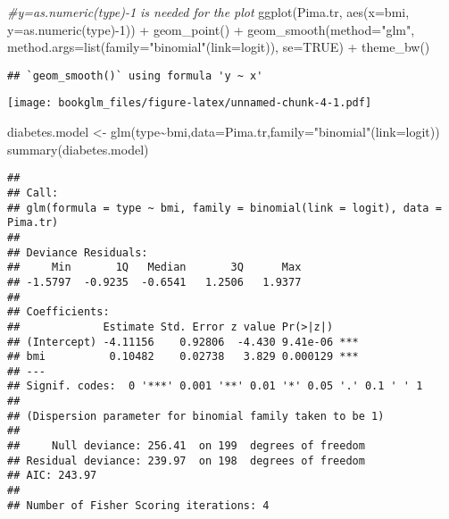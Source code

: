 \documentclass[
]{book}
\newenvironment{Shaded}{\begin{snugshade}}{\end{snugshade}}
\newcommand{\AttributeTok}[1]{\textcolor[rgb]{0.77,0.63,0.00}{#1}}
\newcommand{\CommentTok}[1]{\textcolor[rgb]{0.56,0.35,0.01}{\textit{#1}}}
\newcommand{\ConstantTok}[1]{\textcolor[rgb]{0.00,0.00,0.00}{#1}}
\newcommand{\DecValTok}[1]{\textcolor[rgb]{0.00,0.00,0.81}{#1}}
\newcommand{\FunctionTok}[1]{\textcolor[rgb]{0.00,0.00,0.00}{#1}}
\newcommand{\NormalTok}[1]{#1}
\newcommand{\OtherTok}[1]{\textcolor[rgb]{0.56,0.35,0.01}{#1}}
\newcommand{\SpecialCharTok}[1]{\textcolor[rgb]{0.00,0.00,0.00}{#1}}
\newcommand{\StringTok}[1]{\textcolor[rgb]{0.31,0.60,0.02}{#1}}
\begin{document}
\begin{Shaded}
\begin{Highlighting}[]
\CommentTok{\#y=as.numeric(type){-}1 is needed for the plot}
\FunctionTok{ggplot}\NormalTok{(Pima.tr, }\FunctionTok{aes}\NormalTok{(}\AttributeTok{x=}\NormalTok{bmi, }\AttributeTok{y=}\FunctionTok{as.numeric}\NormalTok{(type)}\SpecialCharTok{{-}}\DecValTok{1}\NormalTok{)) }\SpecialCharTok{+} \FunctionTok{geom\_point}\NormalTok{() }\SpecialCharTok{+}
\FunctionTok{geom\_smooth}\NormalTok{(}\AttributeTok{method=}\StringTok{"glm"}\NormalTok{,}
\AttributeTok{method.args=}\FunctionTok{list}\NormalTok{(}\AttributeTok{family=}\StringTok{"binomial"}\NormalTok{(}\AttributeTok{link=}\NormalTok{logit)), }\AttributeTok{se=}\ConstantTok{TRUE}\NormalTok{) }\SpecialCharTok{+}
\FunctionTok{theme\_bw}\NormalTok{()}
\end{Highlighting}
\end{Shaded}

\begin{verbatim}
## `geom_smooth()` using formula 'y ~ x'
\end{verbatim}

\texttt{[image: bookglm\_files/figure-latex/unnamed-chunk-4-1.pdf]}

\begin{Shaded}
\begin{Highlighting}[]
\NormalTok{diabetes.model }\OtherTok{\textless{}{-}} \FunctionTok{glm}\NormalTok{(type}\SpecialCharTok{\textasciitilde{}}\NormalTok{bmi,}\AttributeTok{data=}\NormalTok{Pima.tr,}\AttributeTok{family=}\StringTok{"binomial"}\NormalTok{(}\AttributeTok{link=}\NormalTok{logit))}
\FunctionTok{summary}\NormalTok{(diabetes.model)}
\end{Highlighting}
\end{Shaded}

\begin{verbatim}
## 
## Call:
## glm(formula = type ~ bmi, family = binomial(link = logit), data = Pima.tr)
## 
## Deviance Residuals: 
##     Min       1Q   Median       3Q      Max  
## -1.5797  -0.9235  -0.6541   1.2506   1.9377  
## 
## Coefficients:
##             Estimate Std. Error z value Pr(>|z|)    
## (Intercept) -4.11156    0.92806  -4.430 9.41e-06 ***
## bmi          0.10482    0.02738   3.829 0.000129 ***
## ---
## Signif. codes:  0 '***' 0.001 '**' 0.01 '*' 0.05 '.' 0.1 ' ' 1
## 
## (Dispersion parameter for binomial family taken to be 1)
## 
##     Null deviance: 256.41  on 199  degrees of freedom
## Residual deviance: 239.97  on 198  degrees of freedom
## AIC: 243.97
## 
## Number of Fisher Scoring iterations: 4
\end{verbatim}
\end{document}
